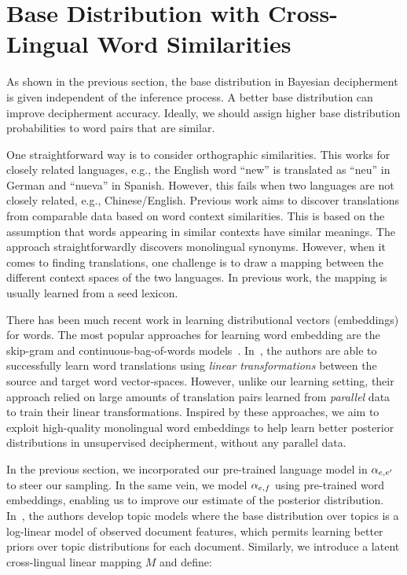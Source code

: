 \section{Base Distribution with Cross-Lingual Word Similarities} \label{sec:theory}

As shown in the previous section, the base distribution in Bayesian decipherment is given independent of the inference process. 
A better base distribution can improve decipherment accuracy. Ideally, we should assign higher base distribution probabilities to word pairs that are similar.

One straightforward way is to consider orthographic similarities. This works for closely related languages, e.g., the English word ``new'' is translated as ``neu'' in German and ``nueva'' in Spanish. However, this fails when two languages are not closely related, e.g., Chinese/English. Previous work aims to discover translations from comparable data based on word context similarities. This is based on the assumption that words appearing in similar contexts have similar meanings. The approach straightforwardly discovers monolingual synonyms. However, when it comes to finding translations, one challenge is to draw a mapping between the different context spaces of the two languages. In previous work, the mapping is usually learned from a seed lexicon.

There has been much recent work in learning distributional vectors (embeddings) for words. The most popular approaches for learning word embedding are the skip-gram and continuous-bag-of-words models~\cite{mikolov2013efficient}. In~, the authors are  able to successfully learn word translations using {\em linear transformations} between the source and target word vector-spaces. However, unlike our learning setting, their approach relied on large amounts of translation pairs learned from \emph{parallel} data to train their linear transformations. Inspired by these approaches, we aim to exploit high-quality monolingual word embeddings to help learn better posterior distributions in unsupervised decipherment, without any parallel data.

In the previous section, we incorporated our pre-trained language model in $\alpha_{e,e'}$ to steer our sampling. In the same vein, we model $\alpha_{e,f}$ using pre-trained word embeddings, enabling us to improve our estimate of the posterior distribution. In~, the authors develop topic models where the base distribution over topics is a log-linear model of observed document features, which permits learning better priors over topic distributions for each document. Similarly, we introduce a latent cross-lingual linear mapping $M$ and define:

